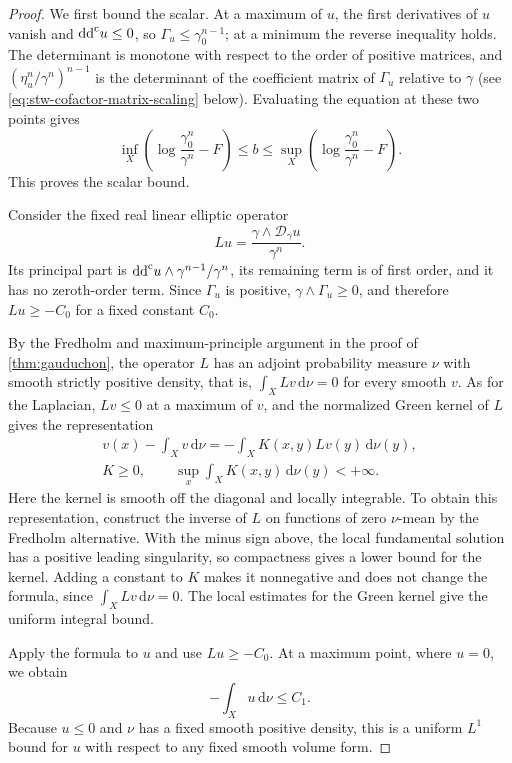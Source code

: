\begin{proof}
We first bound the scalar. At a maximum of $u$, the first derivatives of $u$ vanish and $\mathrm{dd}^{\mathrm{c}} u\leq0$, so $\Gamma_u\leq\gamma_0^{n-1}$; at a minimum the reverse inequality holds. The determinant is monotone with respect to the order of positive matrices, and $(\eta_u^n/\gamma^n)^{n-1}$ is the determinant of the coefficient matrix of $\Gamma_u$ relative to $\gamma$ (see \eqref{eq:stw-cofactor-matrix-scaling} below). Evaluating the equation at these two points gives
\[
 \inf_X\left(\log\frac{\gamma_0^n}{\gamma^n}-F\right)
 \leq b\leq
 \sup_X\left(\log\frac{\gamma_0^n}{\gamma^n}-F\right).
\]
This proves the scalar bound.

Consider the fixed real linear elliptic operator
\[
 Lu=\frac{\gamma\wedge\mathcal D_\gamma u}{\gamma^n}.
\]
Its principal part is $\mathrm{dd}^{\mathrm{c}} u\wedge\gamma^{n-1}/\gamma^n$, its remaining term is of first order, and it has no zeroth-order term. Since $\Gamma_u$ is positive, $\gamma\wedge\Gamma_u\geq0$, and therefore $Lu\geq-C_0$ for a fixed constant $C_0$.

By the Fredholm and maximum-principle argument in the proof of \cref{thm:gauduchon}, the operator $L$ has an adjoint probability measure $\nu$ with smooth strictly positive density, that is, $\int_XLv\,\mathrm{d}\nu=0$ for every smooth $v$. As for the Laplacian, $Lv\leq0$ at a maximum of $v$, and the normalized Green kernel of $L$ gives the representation
\[
 \begin{gathered}
 v(x)-\int_Xv\,\mathrm{d}\nu
       =-\int_X K(x,y)Lv(y)\,\mathrm{d}\nu(y),\\
 K\geq0,\qquad \sup_x\int_XK(x,y)\,\mathrm{d}\nu(y)<+\infty.
 \end{gathered}
\]
Here the kernel is smooth off the diagonal and locally integrable. To obtain this representation, construct the inverse of $L$ on functions of zero $\nu$-mean by the Fredholm alternative. With the minus sign above, the local fundamental solution has a positive leading singularity, so compactness gives a lower bound for the kernel. Adding a constant to $K$ makes it nonnegative and does not change the formula, since $\int_XLv\,\mathrm{d}\nu=0$. The local estimates for the Green kernel give the uniform integral bound.

Apply the formula to $u$ and use $Lu\geq-C_0$. At a maximum point, where $u=0$, we obtain
\[
 -\int_Xu\,\mathrm{d}\nu\leq C_1.
\]
Because $u\leq0$ and $\nu$ has a fixed smooth positive density, this is a uniform $L^1$ bound for $u$ with respect to any fixed smooth volume form.


\end{proof}
